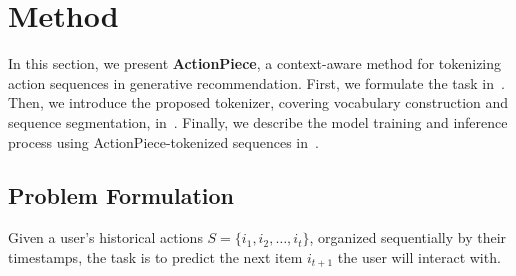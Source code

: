 \section{Method}

In this section, we present \textbf{ActionPiece}, a context-aware method for tokenizing action sequences in generative recommendation. First, we formulate the task in~. Then, we introduce the proposed tokenizer, covering vocabulary construction and sequence segmentation,
in~. Finally, we describe the model training and inference process using ActionPiece-tokenized sequences
in~.

\subsection{Problem Formulation}\label{subsec:problem}


Given a user's historical actions $S = \{i_1, i_2, \ldots, i_t\}$, organized sequentially by their timestamps, the task is to predict the next item $i_{t+1}$ the user will interact with.

